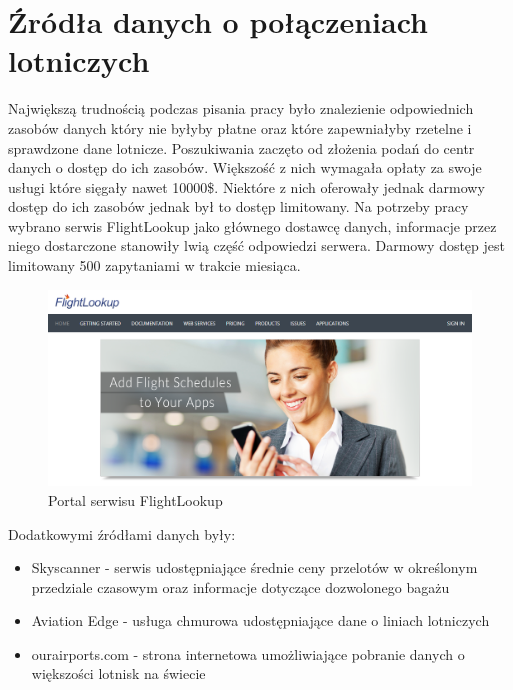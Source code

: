 \documentclass[12pt, twoside]{report}
\begin{document}
\section{Źródła danych o połączeniach lotniczych}
Największą trudnością podczas pisania pracy było znalezienie odpowiednich zasobów danych który nie byłyby płatne oraz które zapewniałyby rzetelne i sprawdzone dane lotnicze. Poszukiwania zaczęto od złożenia podań do centr danych o dostęp do ich zasobów. Większość z nich wymagała opłaty za swoje usługi które sięgały nawet 10000\$. Niektóre z nich oferowały jednak darmowy dostęp do ich zasobów jednak był to dostęp limitowany. Na potrzeby pracy wybrano serwis FlightLookup jako głównego dostawcę danych, informacje przez niego dostarczone stanowiły lwią część odpowiedzi serwera. Darmowy dostęp jest limitowany 500 zapytaniami w trakcie miesiąca.
\vspace{1.0cm}
\begin{figure}[!ht]
\centering
\includegraphics[scale=0.4, keepaspectratio]{flightlookup.png}
\caption{Portal serwisu FlightLookup}
\label{fig:flightlookup}
\end{figure}
\newpage
Dodatkowymi źródłami danych były:
\begin{itemize}[noitemsep,topsep=0pt]
\item Skyscanner - serwis udostępniające średnie ceny przelotów w określonym przedziale czasowym oraz informacje dotyczące dozwolonego bagażu
\item Aviation Edge - usługa chmurowa udostępniające dane o liniach lotniczych 
\item ourairports.com - strona internetowa umożliwiające pobranie danych o większości lotnisk na świecie
\end{itemize}
\end{document}
